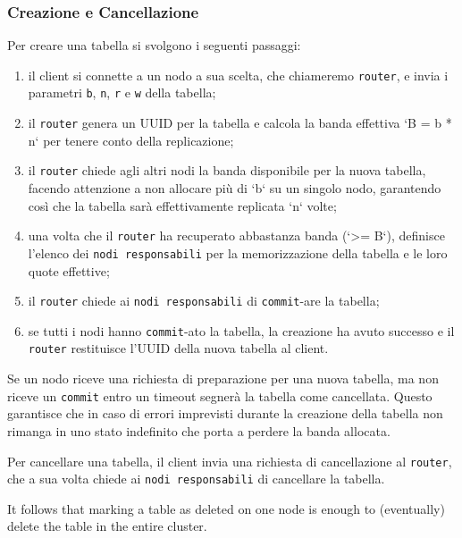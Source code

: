 \subsubsection{Creazione e Cancellazione}
\label{subsubsec:creazione-cancellazione}

Per creare una tabella si svolgono i seguenti passaggi:
\begin{enumerate}
    \item il client si connette a un nodo a sua scelta, che chiameremo \texttt{router}, e invia i parametri \texttt{b}, \texttt{n}, \texttt{r} e \texttt{w} della tabella;
    \item il \texttt{router} genera un UUID per la tabella e calcola la banda effettiva `B = b * n` per tenere conto della replicazione;
    \item il \texttt{router} chiede agli altri nodi la banda disponibile per la nuova tabella, 
        facendo attenzione a non allocare più di `b` su un singolo nodo, 
        garantendo così che la tabella sarà effettivamente replicata `n` volte;
    \item una volta che il \texttt{router} ha recuperato abbastanza banda (`>= B`), 
        definisce l'elenco dei \texttt{nodi responsabili} per la memorizzazione della tabella e le loro quote effettive;
    \item il \texttt{router} chiede ai \texttt{nodi responsabili} di \texttt{commit}-are la tabella;
    \item se tutti i nodi hanno \texttt{commit}-ato la tabella, la creazione ha avuto successo e il \texttt{router} restituisce l'UUID della nuova tabella al client.
\end{enumerate}


Se un nodo riceve una richiesta di preparazione per una nuova tabella, ma non riceve un \texttt{commit} entro un timeout segnerà la tabella come cancellata.
Questo garantisce che in caso di errori imprevisti durante la creazione della tabella non rimanga in uno stato indefinito che porta a perdere la banda allocata.

Per cancellare una tabella, il client invia una richiesta di cancellazione al \texttt{router}, che a sua volta chiede ai \texttt{nodi responsabili} di cancellare la tabella.

It follows that marking a table as deleted on one node 
 is enough to (eventually) delete the table in the entire cluster.

